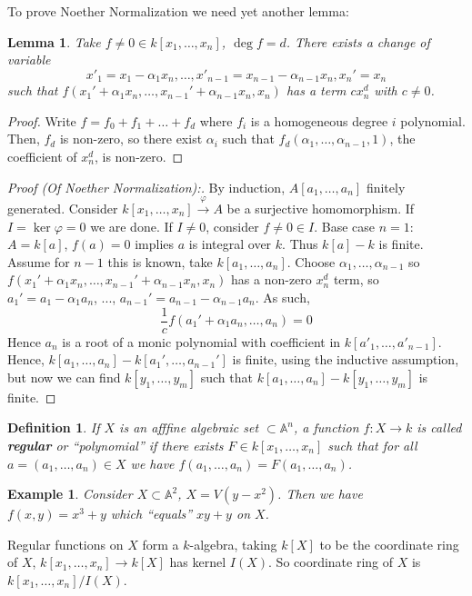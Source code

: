\documentclass[12pt]{article}
\newcommand{\A}{\mathbb{A}}
\renewcommand{\phi}{\varphi}
\newtheorem{definition}{Definition}[section]
\newtheorem*{example}{Example}
\newtheorem{lemma}{Lemma}[section]
\begin{document}
    To prove Noether Normalization we need yet another lemma:
    \begin{lemma}
        Take $f \neq 0 \in k[x_1, \dots, x_n]$, $\deg f = d$. There exists a change of variable
         $$x'_1 = x_1 - \alpha_1 x_n, \dots, x'_{n-1} = x_{n-1} - \alpha_{n-1}x_n, x_n' = x_n$$
        such that $f(x_1' + \alpha_1x_n, \dots, x_{n-1}'+\alpha_{n-1}x_n, x_n)$ has a term $cx^d_n$ with $c \neq 0$.
    \end{lemma}
    \begin{proof}
        Write $f = f_0 + f_1 + \dots + f_d$ where $f_i$ is a homogeneous degree $i$ polynomial. Then, $f_d$ is non-zero, so there exist $\alpha_i$ such that $f_d(\alpha_1, \dots, \alpha_{n-1}, 1)$, the coefficient of $x^d_n$, is non-zero.
    \end{proof}
    \begin{proof}
        [Proof (Of Noether Normalization):] By induction, $A[a_1, \dots, a_n]$ finitely generated. Consider $k[x_1, \dots, x_n] \xrightarrow{\phi} A$ be a surjective homomorphism. If $I = \ker \phi = 0$ we are done. If $I \neq 0$, consider $f \neq 0 \in I$. Base case $n=1$: $A = k[a]$, $f(a) = 0$ implies $a$ is integral over $k$. Thus $k[a] - k$ is finite. Assume for $n-1$ this is known, take $k[a_1, \dots, a_n]$. Choose $\alpha_1, \dots, \alpha_{n-1}$ so $f(x_1' + \alpha_1x_n, \dots, x_{n-1}'+\alpha_{n-1}x_n, x_n)$ has a non-zero $x_n^d$ term, so $a_1' = a_1 - \alpha_1a_n$, ..., $a_{n-1}' = a_{n-1} - \alpha_{n-1}a_n$. As such,
        $$\frac{1}{c}f(a_1' + \alpha_1a_n, \dots, a_n) = 0$$
        Hence $a_n$ is a root of a monic polynomial with coefficient in $k[a'_1, \dots, a'_{n-1}]$. Hence, $k[a_1, \dots, a_n] - k[a_1', \dots, a_{n-1}']$ is finite, using the inductive assumption, but now we can find $k[y_1, \dots, y_m]$ such that $k[a_1, \dots, a_n] - k[y_1, \dots, y_m]$ is finite.
    \end{proof}
    \begin{definition}
        If $X$ is an afffine algebraic set $\subset \A^n$, a function $f: X \to k$ is called \textbf{regular} or ``polynomial'' if there exists $F \in k[x_1, \dots, x_n]$ such that for all $a = (a_1, \dots, a_n) \in X$ we have $f(a_1, \dots, a_n) = F(a_1, \dots, a_n)$.
    \end{definition}
    \begin{example}
        Consider $X \subset \A^2$, $X = V(y-x^2)$. Then we have $f(x, y) = x^3 + y$ which ``equals'' $xy + y$ on $X$.
    \end{example}
    Regular functions on $X$ form a $k$-algebra, taking $k[X]$ to be the coordinate ring of $X$, $k[x_1, \dots, x_n] \to k[X]$ has kernel $I(X)$. So coordinate ring of $X$ is $k[x_1, \dots, x_n]/I(X)$.
\end{document}
